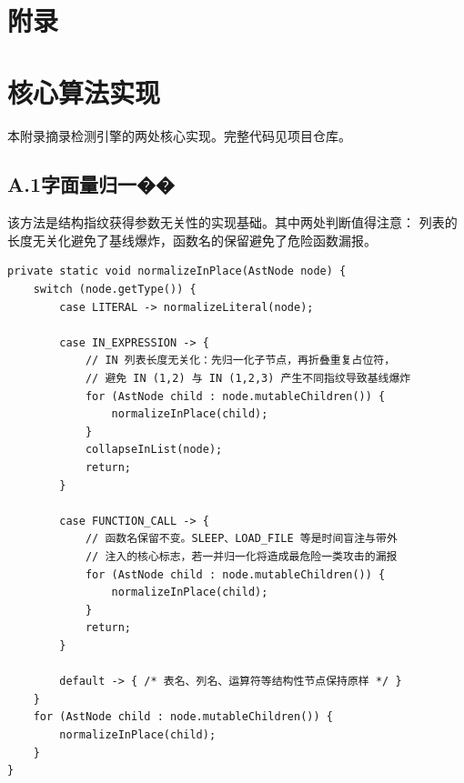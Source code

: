 \clearpage
\appendix
{}
{}
\section*{附\quad 录}
\setcounter{section}{0}
\renewcommand{\thesection}{附录~\Alph{section}}
\renewcommand{\thetable}{\Alph{section}--\arabic{table}}
\renewcommand{\thefigure}{\Alph{section}--\arabic{figure}}
\setcounter{table}{0}
\setcounter{figure}{0}

\section{核心算法实现}
\setcounter{table}{0}

本附录摘录检测引擎的两处核心实现。完整代码见项目仓库。

\subsection*{A.1\quad 字面量归一��}

该方法是结构指纹获得参数无关性的实现基础。其中两处判断值得注意：
 列表的长度无关化避免了基线爆炸，函数名的保留避免了危险函数漏报。

\begin{lstlisting}[style=javastyle, caption={AST 字面量归一化的核心逻辑}]
private static void normalizeInPlace(AstNode node) {
    switch (node.getType()) {
        case LITERAL -> normalizeLiteral(node);

        case IN_EXPRESSION -> {
            // IN 列表长度无关化：先归一化子节点，再折叠重复占位符，
            // 避免 IN (1,2) 与 IN (1,2,3) 产生不同指纹导致基线爆炸
            for (AstNode child : node.mutableChildren()) {
                normalizeInPlace(child);
            }
            collapseInList(node);
            return;
        }

        case FUNCTION_CALL -> {
            // 函数名保留不变。SLEEP、LOAD_FILE 等是时间盲注与带外
            // 注入的核心标志，若一并归一化将造成最危险一类攻击的漏报
            for (AstNode child : node.mutableChildren()) {
                normalizeInPlace(child);
            }
            return;
        }

        default -> { /* 表名、列名、运算符等结构性节点保持原样 */ }
    }
    for (AstNode child : node.mutableChildren()) {
        normalizeInPlace(child);
    }
}
\end{lstlisting}

